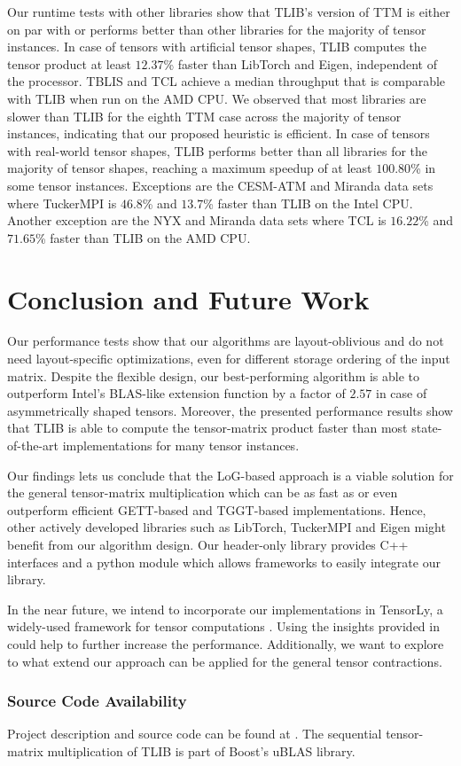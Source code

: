 Our runtime tests with other libraries show that TLIB's  version of TTM is either on par with or performs better than other libraries for the majority of tensor instances.
In case of tensors with artificial tensor shapes, TLIB computes the tensor product at least $12.37$\% faster than LibTorch and Eigen, independent of the processor.
TBLIS and TCL achieve a median throughput that is comparable with TLIB when run on the AMD CPU.
We observed that most libraries are slower than TLIB for the eighth TTM case across the majority of tensor instances, indicating that our proposed heuristic is efficient.
In case of tensors with real-world tensor shapes, TLIB performs better than all libraries for the majority of tensor shapes, reaching a maximum speedup of at least $100.80$\% in some tensor instances.
Exceptions are the CESM-ATM and Miranda data sets where TuckerMPI is $46.8$\% and $13.7$\% faster than TLIB on the Intel CPU.
Another exception are the NYX and Miranda data sets where TCL is $16.22$\% and $71.65$\% faster than TLIB on the AMD CPU.


\section{Conclusion and Future Work}
\label{sec:conclusion}
Our performance tests show that our algorithms are layout-oblivious and do not need layout-specific optimizations, even for different storage ordering of the input matrix.
Despite the flexible design, our best-performing algorithm is able to outperform Intel's BLAS-like extension function  by a factor of $2.57$ in case of asymmetrically shaped tensors.
Moreover, the presented performance results show that TLIB is able to compute the tensor-matrix product faster than most state-of-the-art implementations for many tensor instances.

Our findings lets us conclude that the LoG-based approach is a viable solution for the general tensor-matrix multiplication which can be as fast as or even outperform efficient GETT-based and TGGT-based implementations.
Hence, other actively developed libraries such as LibTorch, TuckerMPI and Eigen might benefit from our algorithm design.
Our header-only library provides C++ interfaces and a python module which allows frameworks to easily integrate our library.

In the near future, we intend to incorporate our implementations in TensorLy, a widely-used framework for tensor computations \cite{cohen:2022:tensor.computations, kossaifi:2019:tensorly}.
Using the insights provided in \cite{li:2015:input} could help to further increase the performance.
Additionally, we want to explore to what extend our approach can be applied for the general tensor contractions.

\subsubsection{Source Code Availability}
Project description and source code can be found at .
The sequential tensor-matrix multiplication of TLIB is part of Boost's uBLAS library.